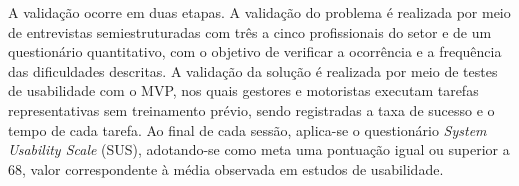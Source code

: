 A validação ocorre em duas etapas. A validação do problema é realizada por meio de entrevistas semiestruturadas com três a cinco profissionais do setor e de um questionário quantitativo, com o objetivo de verificar a ocorrência e a frequência das dificuldades descritas. A validação da solução é realizada por meio de testes de usabilidade com o MVP, nos quais gestores e motoristas executam tarefas representativas sem treinamento prévio, sendo registradas a taxa de sucesso e o tempo de cada tarefa. Ao final de cada sessão, aplica-se o questionário \textit{System Usability Scale} (SUS), adotando-se como meta uma pontuação igual ou superior a 68, valor correspondente à média observada em estudos de usabilidade.

